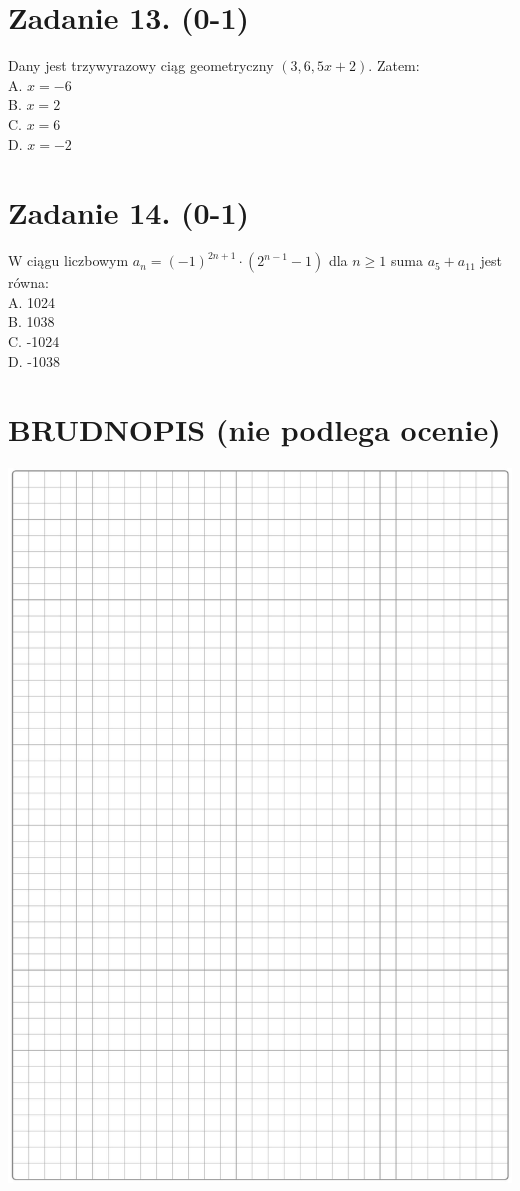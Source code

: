 \documentclass[10pt]{article}
\begin{document}
\section*{Zadanie 13. (0-1)}
Dany jest trzywyrazowy ciąg geometryczny \((3,6,5 x+2)\). Zatem:\\
A. \(x=-6\)\\
B. \(x=2\)\\
C. \(x=6\)\\
D. \(x=-2\)

\section*{Zadanie 14. (0-1)}
W ciągu liczbowym \(a_{n}=(-1)^{2 n+1} \cdot\left(2^{n-1}-1\right)\) dla \(n \geq 1\) suma \(a_{5}+a_{11}\) jest równa:\\
A. 1024\\
B. 1038\\
C. -1024\\
D. -1038

\section*{BRUDNOPIS (nie podlega ocenie)}
\begin{center}
\includegraphics[max width=\textwidth]{2024_11_21_cdea326d19d0c2132b88g-05}
\end{center}
\end{document}
